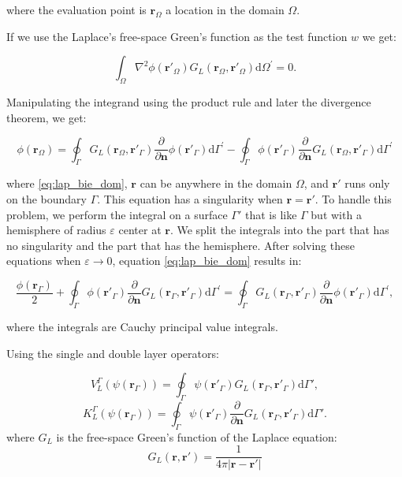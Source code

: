 where the evaluation point is $\mathbf{r}_\Omega$ a location in the domain $\Omega$.

If we use the Laplace's free-space Green's function as the test function $w$ we
get:

\begin{equation} \label{eq:lap_weak2}
\int_\Omega \nabla^2 \phi(\mathbf{r}'_\Omega) G_L(\mathbf{r}_\Omega,\mathbf{r}'_\Omega) \text{d} \Omega^\prime= 0.
\end{equation}

Manipulating the integrand using the product rule and later the divergence 
theorem, we get:

\begin{equation} \label{eq:lap_bie_dom}
\phi(\mathbf{r}_\Omega) = \oint_\Gamma G_L(\mathbf{r}_\Omega,\mathbf{r}'_\Gamma)  \frac{\partial} {\partial \mathbf{n}} \phi(\mathbf{r}'_\Gamma)  \text{d} \Gamma^\prime - \oint_\Gamma \phi(\mathbf{r}'_\Gamma)  \frac{\partial}{\partial \mathbf{n}} G_L(\mathbf{r}_\Omega,\mathbf{r}'_\Gamma) \text{d} \Gamma^\prime
\end{equation}

where \eqref{eq:lap_bie_dom}, $\mathbf{r}$ can be anywhere in the domain $\Omega$, 
and $\mathbf{r}'$ runs only on the boundary $\Gamma$. This equation has a 
singularity when $\mathbf{r}=\mathbf{r}'$. To handle this problem, we perform the
integral on a surface $\Gamma'$ that is like $\Gamma$ but with a hemisphere of 
radius $\varepsilon$ center at $\mathbf{r}$. We split the integrals into the part
that has no singularity and the part that has the hemisphere. After solving these
equations when $\varepsilon \to 0$, equation \eqref{eq:lap_bie_dom} results in:

\begin{equation} \label{eq:lap_bie}
\frac{\phi(\mathbf{r}_\Gamma)}{2} +  \oint_\Gamma \phi(\mathbf{r}'_\Gamma)  \frac{\partial}{\partial \mathbf{n}} G_L(\mathbf{r}_\Gamma,\mathbf{r}'_\Gamma) \text{d} \Gamma^\prime = \oint_\Gamma G_L(\mathbf{r}_\Gamma,\mathbf{r}'_\Gamma)  \frac{\partial} {\partial \mathbf{n}} \phi(\mathbf{r}'_\Gamma)  \text{d} \Gamma^\prime,
\end{equation}

where the integrals are Cauchy principal value integrals.

Using the single and double layer operators:

\begin{equation}\label{eq:single_layer}
   V^{\Gamma}_L (\psi(\mathbf{r}_\Gamma)) = \oint_\Gamma \psi(\mathbf{r}'_\Gamma) G_L(\mathbf{r}_\Gamma, \mathbf{r}'_\Gamma) \text{d} \Gamma',
   \end{equation}
   \begin{equation}\label{eq:double_layer}
   K^{\Gamma}_L (\psi(\mathbf{r}_\Gamma)) = \oint_\Gamma \psi(\mathbf{r}'_\Gamma) \frac{\partial}{\partial \mathbf{n}}G_L(\mathbf{r}_\Gamma, \mathbf{r}'_\Gamma) \text{d} \Gamma'.
   \end{equation}
where $G_L$ is the free-space Green's function of the Laplace equation:
   \begin{equation}
   G_L(\mathbf{r},\mathbf{r}') = \frac{1}{4\pi|\mathbf{r}-\mathbf{r}'|}
   \end{equation}
   

